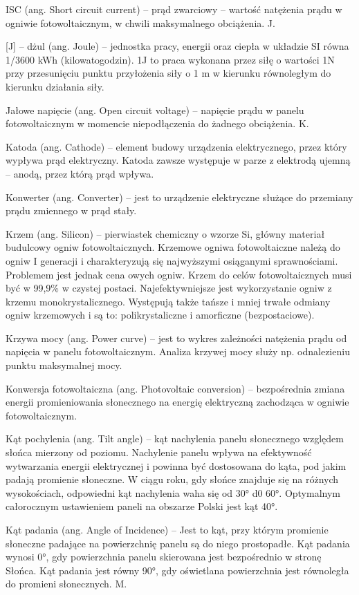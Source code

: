 \documentclass[12pt,a4paper]{article}
\begin{document}
ISC (ang. Short circuit current) – prąd zwarciowy – wartość natężenia prądu w ogniwie fotowoltaicznym, w chwili maksymalnego obciążenia.
J.

[J] – dżul (ang. Joule) – jednostka pracy, energii oraz ciepła w układzie SI równa 1/3600 kWh (kilowatogodzin). 1J to praca wykonana przez siłę o wartości 1N przy przesunięciu punktu przyłożenia siły o 1 m w kierunku równoległym do kierunku działania siły.

Jałowe napięcie (ang. Open circuit voltage) – napięcie prądu w panelu fotowoltaicznym w momencie niepodłączenia do żadnego obciążenia.
K.

Katoda (ang. Cathode) – element budowy urządzenia elektrycznego, przez który wypływa prąd elektryczny. Katoda zawsze występuje w parze z elektrodą ujemną – anodą, przez którą prąd wpływa.

Konwerter (ang. Converter) – jest to urządzenie elektryczne służące do przemiany prądu zmiennego w prąd stały.

Krzem (ang. Silicon) – pierwiastek chemiczny o wzorze Si, główny materiał budulcowy ogniw fotowoltaicznych.  Krzemowe ogniwa fotowoltaiczne należą do ogniw I generacji i charakteryzują się najwyższymi osiąganymi sprawnościami. Problemem jest jednak cena owych ogniw. Krzem do celów fotowoltaicznych musi być w 99,9\% w czystej postaci. Najefektywniejsze jest wykorzystanie ogniw z krzemu monokrystalicznego. Występują także tańsze i mniej trwałe odmiany ogniw krzemowych i są to: polikrystaliczne i amorficzne (bezpostaciowe).

Krzywa mocy (ang. Power curve) – jest to wykres zależności natężenia prądu od napięcia w panelu fotowoltaicznym. Analiza krzywej mocy służy np. odnalezieniu punktu maksymalnej mocy.

Konwersja fotowoltaiczna (ang. Photovoltaic conversion) – bezpośrednia zmiana energii promieniowania słonecznego na energię elektryczną zachodząca w ogniwie fotowoltaicznym.

Kąt pochylenia (ang. Tilt angle) – kąt nachylenia panelu słonecznego względem słońca mierzony od poziomu. Nachylenie panelu wpływa na efektywność wytwarzania energii elektrycznej i powinna być dostosowana do kąta, pod jakim padają promienie słoneczne. W ciągu roku, gdy słońce znajduje się na różnych wysokościach, odpowiedni kąt nachylenia waha się od 30° d0 60°. Optymalnym całorocznym ustawieniem paneli na obszarze Polski jest kąt 40°.

Kąt padania (ang. Angle of Incidence) – Jest to kąt, przy którym promienie słoneczne padające na powierzchnię panelu są do niego prostopadłe. Kąt padania wynosi 0°, gdy powierzchnia panelu skierowana jest bezpośrednio w stronę Słońca. Kąt padania jest równy 90°, gdy oświetlana powierzchnia jest równoległa do promieni słonecznych.
M.
\end{document}
